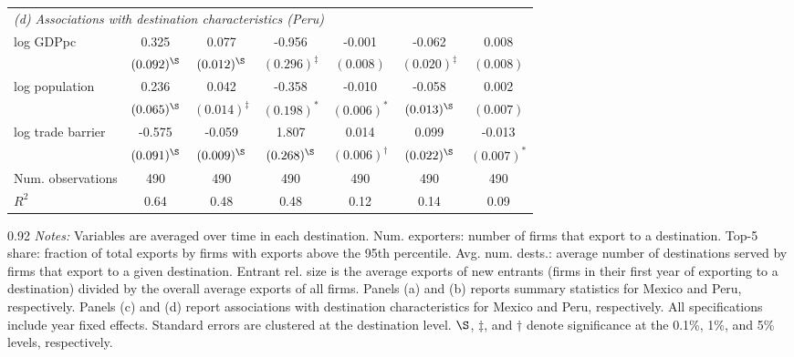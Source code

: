 \begin{table}[h!]
\begin{center}
\begin{tabular}{lcccccc}
\\
\multicolumn{7}{l}{\textit{(d) Associations with destination characteristics (Peru)}}\\[4pt]
log GDPpc& 0.325& 0.077& -0.956& -0.001& -0.062& 0.008\\
& $(0.092)^\S$& $(0.012)^\S$& $(0.296)^\ddagger$& $(0.008)$& $(0.020)^\ddagger$& $(0.008)$\\[4pt]
log population& 0.236& 0.042& -0.358& -0.010& -0.058& 0.002\\
& $(0.065)^\S$& $(0.014)^\ddagger$& $(0.198)^*$& $(0.006)^*$& $(0.013)^\S$& $(0.007)$\\[4pt]
log trade barrier& -0.575& -0.059& 1.807& 0.014& 0.099& -0.013\\
& $(0.091)^\S$& $(0.009)^\S$& $(0.268)^\S$& $(0.006)^\dagger$& $(0.022)^\S$& $(0.007)^*$\\[4pt]
Num. observations& 490& 490& 490& 490& 490& 490\\
$R^2$& 0.64& 0.48& 0.48& 0.12& 0.14& 0.09\\
\bottomrule
\end{tabular}
\vspace{-0.1cm}
\begin{fignote2}{0.92\textwidth}
\textit{Notes:} Variables are averaged over time in each destination. Num. exporters: number of firms that export to a destination. Top-5 share: fraction of total exports by firms with exports above the 95th percentile. Avg. num. dests.: average number of destinations served by firms that export to a given destination. Entrant rel. size is the average exports of new entrants (firms in their first year of exporting to a destination) divided by the overall average exports of all firms. Panels (a) and (b) reports summary statistics for Mexico and Peru, respectively. Panels (c) and (d) report associations with destination characteristics for Mexico and Peru, respectively. All specifications include year fixed effects. Standard errors are clustered at the destination level. $\S$, $\ddagger$, and $\dagger$ denote significance at the 0.1\%, 1\%, and 5\% levels, respectively.
\end{fignote2}
\end{center}
\normalsize
\end{table}
